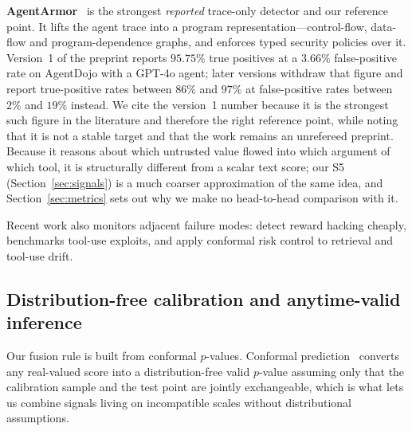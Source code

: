 \documentclass[pdflatex,sn-basic]{sn-jnl}%
\theoremstyle{thmstyleone}
\theoremstyle{thmstyletwo}
\theoremstyle{thmstylethree}
\begin{document}
\textbf{AgentArmor}~\citep{wang2025agentarmor} is the strongest \emph{reported}
trace-only detector and our reference point. It lifts the agent trace into a
program representation---control-flow, data-flow and program-dependence
graphs, and enforces typed security policies over it. Version~1 of the preprint
reports $95.75\%$ true positives at a $3.66\%$ false-positive rate on AgentDojo
with a GPT-4o agent; later versions withdraw that figure and report true-positive
rates between $86\%$ and $97\%$ at false-positive rates between $2\%$ and $19\%$
instead. We cite the version~1 number because it is the strongest such figure in
the literature and therefore the right reference point, while noting that it is
not a stable target and that the work remains an unrefereed preprint. Because it
reasons about which untrusted value flowed into which argument of which tool, it is
structurally different from a scalar text score; our S5 (Section~\ref{sec:signals})
is a much coarser approximation of the same idea, and Section~\ref{sec:metrics}
sets out why we make no head-to-head comparison with it.

Recent work also monitors adjacent failure modes: \citet{belenky2026cheap} detect
reward hacking cheaply, \citet{thaman2026rewardhacking} benchmarks tool-use
exploits, and \citet{opoku2026toolchain} apply conformal risk control to
retrieval and tool-use drift.

\subsection{Distribution-free calibration and anytime-valid inference}

Our fusion rule is built from conformal $p$-values. Conformal
prediction~\citep{vovk2022algorithmic} converts any real-valued score into a
distribution-free valid $p$-value assuming only that the calibration sample and
the test point are jointly exchangeable, which is what lets us combine signals living on incompatible scales
without distributional assumptions.
\end{document}
